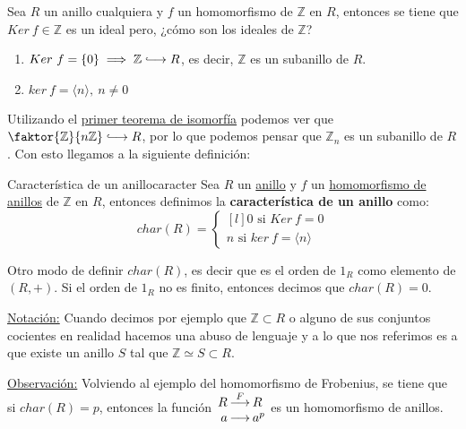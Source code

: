 \documentclass[10pt, a4paper]{article}
\newcommand{\Z}{\mathbb{Z}}
\newcommand{\obs}{\underline{Observación:} }
\newcommand{\nota}{\underline{Notación:} }
\newcommand{\anillo}[1][]{\hyperref[def:anillo]{anillo}#1 }
\newcommand{\longhookrightarrow}{\lhook\joinrel\longrightarrow}
\begin{document}
\vspace{3mm}

Sea $R$ un anillo cualquiera y $f$ un homomorfismo de $\Z$ en $R$, entonces se tiene que $Ker\ f \in \Z$ es un ideal pero, ¿cómo son los ideales de $\Z$?
\begin{enumerate}[label=\alph*)]
	\item $Ker\ f = \{0\} \implies \Z \longhookrightarrow R$, es decir, $\Z$ es un subanillo de $R$.
	\item $ker\ f = \langle n \rangle,\ n \neq 0$
\end{enumerate}

Utilizando el \hyperref[theo:iso_1]{primer teorema de isomorfía} podemos ver que $\faktor{\Z}{n\Z} \longhookrightarrow R$, por lo que podemos pensar que $\Z_n$ es un subanillo de $R$. Con esto llegamos a la siguiente definición:

\begin{definition}{Característica de un anillo}{caracter}
Sea $R$ un \anillo y $f$ un \hyperref[def:homomorfismo]{homomorfismo de anillos} de $\Z$ en $R$, entonces definimos la \textbf{característica de un anillo} como:
\[
char(R) = \left \{
\begin{matrix*}[l]
	0 \text{ si } Ker\ f = 0 \\
	n \text{ si } ker\ f = \langle n \rangle
\end{matrix*} \right .
\]

Otro modo de definir $char(R)$, es decir que es el orden de $1_R$ como elemento de $(R, +)$. Si el orden de $1_R$ no es finito, entonces decimos que $char(R) = 0$.
\end{definition}

\nota Cuando decimos por ejemplo que $\Z \subset R$ o alguno de sus conjuntos cocientes en realidad hacemos una abuso de lenguaje y a lo que nos referimos es a que existe un anillo $S$ tal que $\Z \simeq S \subset R$.

\vspace{3mm}


\obs Volviendo al ejemplo del homomorfismo de Frobenius, se tiene que si $char(R) = p$, entonces la función
$\arraycolsep=1pt
\begin{array}{rcl}
	R & \overset{F}{\longrightarrow} & R \\
	a & \longrightarrow & a^p
\end{array}
$ es un homomorfismo de anillos.
\end{document}
